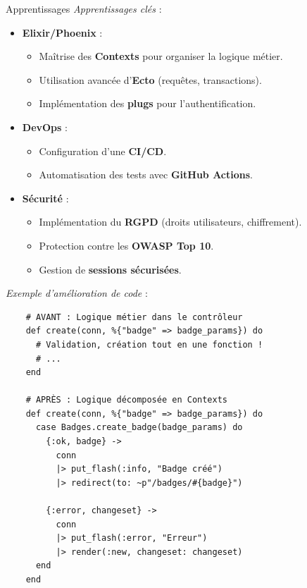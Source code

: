 \begin{for_you}{Apprentissages}
    \textit{Apprentissages clés} :
    \begin{itemize}
        \item \textbf{Elixir/Phoenix} :
              \begin{itemize}
                  \item Maîtrise des \textbf{Contexts} pour organiser la logique métier.
                  \item Utilisation avancée d’\textbf{Ecto} (requêtes, transactions).
                  \item Implémentation des \textbf{plugs} pour l’authentification.
              \end{itemize}
        \item \textbf{DevOps} :
              \begin{itemize}
                  \item Configuration d'une \textbf{CI/CD}.
                  \item Automatisation des tests avec \textbf{GitHub Actions}.
              \end{itemize}
        \item \textbf{Sécurité} :
              \begin{itemize}
                  \item Implémentation du \textbf{RGPD} (droits utilisateurs, chiffrement).
                  \item Protection contre les \textbf{OWASP Top 10}.
                  \item Gestion de \textbf{sessions sécurisées}.
                  \newline
              \end{itemize}
    \end{itemize}

    \textit{Exemple d’amélioration de code} :
    \begin{lstlisting}
    # AVANT : Logique métier dans le contrôleur
    def create(conn, %{"badge" => badge_params}) do
      # Validation, création tout en une fonction !
      # ...
    end

    # APRÈS : Logique décomposée en Contexts
    def create(conn, %{"badge" => badge_params}) do
      case Badges.create_badge(badge_params) do
        {:ok, badge} ->
          conn
          |> put_flash(:info, "Badge créé")
          |> redirect(to: ~p"/badges/#{badge}")

        {:error, changeset} ->
          conn
          |> put_flash(:error, "Erreur")
          |> render(:new, changeset: changeset)
      end
    end

    \end{lstlisting}
\end{for_you}

